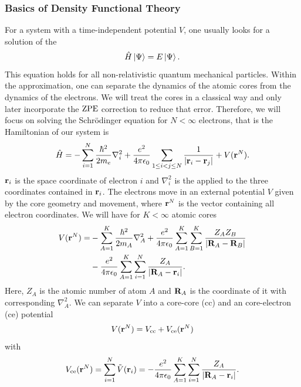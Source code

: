 \documentclass[8.5pt,twoside,twocolumn]{article}
\newcommand\zpe{\enmat{\te{ZPE}}}
\renewcommand\r{\bo r}
\theoremstyle{standard}
\begin{document}
\subsubsection{Basics of Density Functional Theory}
For a system with a time-independent potential $V$, one usually looks for a
solution of the 
\begin{equation}
 \hat{H} \left|\Psi{}\right\rangle = E \left|\Psi{}\right\rangle.
 \label{Theo:Schroedinger}
\end{equation}
This equation holds for all non-relativistic quantum mechanical particles.
Within the  approximation, one can separate the dynamics
of the atomic cores from the dynamics of the electrons. We will treat the cores
in a classical way and only later incorporate the $\zpe$ correction to reduce
that error. Therefore, we will focus on solving the Schrödinger
equation for $N < \infty$ electrons, that is the Hamiltonian of our system is
\begin{equation}
 \Ha = -\sum_{i=1}^N \frac{\hbar^2}{2m_e} \nabla_i^2 + \frac {e^2} {4 \pi \e_0} \sum_{1\le i < j \le N} \frac 1 {\abs{\r_i - \r_j}} + V(\r^N).
 \label{Theo:Hamiltonian}
\end{equation}
$\r_i$ is the space coordinate of electron $i$ and $\nabla_i^2$ is the  applied to the three coordinates contained in $\r_i$. 
The electrons move in an external potential $V$ given by the core geometry and movement, where $\r^N$ is the vector containing
all electron coordinates. We will have for $K < \infty$ atomic cores 
\begin{equation}
\begin{aligned}
V(\r^N)=&-\sum_{A=1}^K \frac{\hbar^2}{2m_A} \nabla_A^2 + \frac {e^2} {4 \pi \e_0} \sum_{A=1}^K \sum_{B=1}^K \frac {Z_A Z_B} {\abs{\bo R_A - \bo R_B}} \\
   &- \frac {e^2} {4 \pi \e_0} \sum_{A=1}^K \sum_{i=1}^N \frac {Z_A} {\abs{\bo R_A - \r_i}}. 
\end{aligned}
\label{Theo:CorePotential}
\end{equation}
Here, $Z_A$ is the atomic number of atom $A$ and $\mathbf{R}_A$ is the coordinate of it with corresponding $\nabla_A^2$. We
can separate $V$ into a core-core (cc) and an core-electron (ce) potential
\newcommand\vce{V_{\te{ce}}}
\newcommand\vcc{V_{\te{cc}}}
\begin{equation}
 V(\r^N)=\vcc+\vce(\r^N)
\label{Theo:SeparatePotential}
\end{equation}
with
\begin{equation}
 \vce(\r^N)=\sum_{i=1}^N \tilde V(\r_i) = - \frac {e^2} {4 \pi \e_0} \sum_{A=1}^K \sum_{i=1}^N \frac {Z_A} {\abs{\bo R_A - \r_i}}.
 \label{Theo:CoreElectronPotential}
\end{equation}
\end{document}
